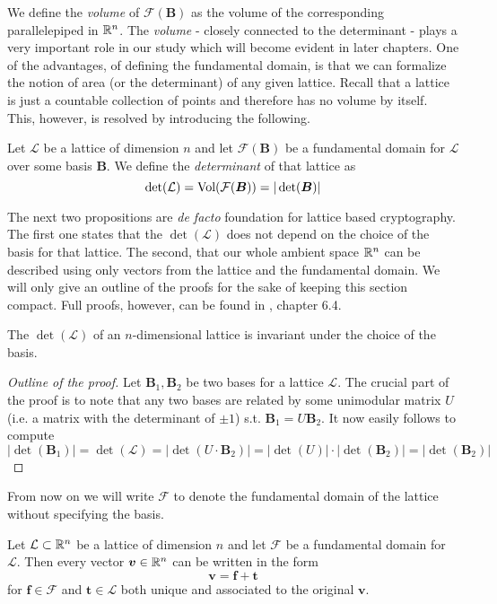 We define the \textit{volume} of $\mathcal{F}(\bm{B})$ as the volume of the corresponding parallelepiped in $\mathbb{R}^n$. The \textit{volume} - closely connected to the determinant - plays a very important role in our study which will become evident in later chapters. One of the advantages, of defining the fundamental domain, is that we can formalize the notion of area (or the determinant) of any given lattice. Recall that a lattice is just a countable collection of points and therefore has no volume by itself. This, however, is resolved by introducing the following.

\begin{definition}
    Let $\mathcal{L}$ be a lattice of dimension $n$ and let $\mathcal{F}(\bm{B})$ be a fundamental domain for $\mathcal{L}$ over some basis $\bm{B}$. We define the \textit{determinant} of that lattice as
    $$ \det (\mathcal{L}) = \text{Vol}(\mathcal{F(\boldsymbol{B})}) = |\det (\boldsymbol{B}) |$$
\end{definition}

The next two propositions are \textit{de facto} foundation for lattice based cryptography. The first one states that the $\det (\mathcal{L})$ does not depend on the choice of the basis for that lattice. The second, that our whole ambient space $\mathbb{R}^n$ can be described using only vectors from the lattice and the fundamental domain. We will only give an outline of the proofs for the sake of keeping this section compact. Full proofs, however, can be found in \cite{book}, chapter 6.4.

\begin{proposition}
    The $\det (\mathcal{L})$ of an $n$-dimensional lattice is invariant under the choice of the basis.
\end{proposition}

\begin{proof}[Outline of the proof]
    Let $\bm{B}_1, \bm{B}_2$ be two bases for a lattice $\mathcal{L}$. The crucial part of the proof is to note that any two bases are related by some unimodular matrix $U$ (i.e. a matrix with the determinant of $\pm 1$) s.t. $\bm{B}_1 = U \bm{B}_2$. It now easily follows to compute $| \det (\bm{B}_1) | = \det (\mathcal{L}) = | \det (U \cdot \bm{B}_2) | = | \det(U) | \cdot | \det(\bm{B}_2) | = | \det(\bm{B}_2)|$ 
\end{proof}

From now on we will write $\mathcal{F}$ to denote the fundamental domain of the lattice without specifying the basis.

\begin{proposition}
    Let $\mathcal{L} \subset \mathbb{R}^n$ be a lattice of dimension $n$ and let $\mathcal{F}$ be a fundamental domain for $\mathcal{L}$. Then every vector $\boldsymbol{v} \in \mathbb{R}^n$ can be written in the form 
    $$\bm{v} = \bm{f} + \bm{t}$$
    for $\bm{f} \in \mathcal{F}$ and $\bm{t} \in \mathcal{L}$ both unique and associated to the original $\bm{v}$.
\end{proposition}

